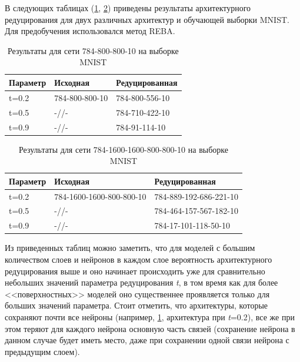 В следующих таблицах (\ref{table:architect_reduce_mnist_one}, \ref{table:architect_reduce_mnist_two}) приведены результаты архитектурного редуцирования для двух различных архитектур и обучающей выборки MNIST. Для предобучения использовался метод REBA.

\begin{table} [!h]
  \small
  \caption{Результаты для сети 784-800-800-10 на выборке MNIST}\label{table:architect_reduce_mnist_one}
    \centering
    \begin{tabular}{| p{2cm} | p{6cm} | p{6cm} |}
    \hline
        \textbf{Параметр} & \textbf{Исходная} & \textbf{Редуцированная}\\
    \hline
    t=0.2 & 784-800-800-10 & 784-800-556-10\\
    \hline
    t=0.5 & -//- & 784-710-422-10\\
    \hline
    t=0.9 & -//- & 784-91-114-10\\
    \hline
    \end{tabular}
    \end{table}
    
\begin{table} [!h]
  \small
    \caption{Результаты для сети 784-1600-1600-800-800-10 на выборке MNIST}\label{table:architect_reduce_mnist_two}
    \centering
    \begin{tabular}{| p{2cm} | p{6cm} | p{6cm} |}
    \hline
        \textbf{Параметр} & \textbf{Исходная} & \textbf{Редуцированная}\\
    \hline
    t=0.2 & 784-1600-1600-800-800-10 & 784-889-192-686-221-10\\
    \hline
    t=0.5 & -//- & 784-464-157-567-182-10\\
    \hline
    t=0.9 & -//- & 784-17-101-118-50-10\\
    \hline
    \end{tabular}
    \end{table}
    
Из приведенных таблиц можно заметить, что для моделей с большим количеством слоев и нейронов в каждом слое вероятность архитектурного редуцирования выше и оно начинает происходить уже для сравнительно небольших значений параметра редуцирования \textit{t}, в том время как для более <<поверхностных>> моделей оно существеннее проявляется только для больших значений параметра. Стоит отметить, что архитектуры, которые сохраняют почти все нейроны (например, \ref{table:architect_reduce_mnist_one}, архитектура при \textit{t}=0.2), все же при этом теряют для каждого нейрона основную часть связей (сохранение нейрона в данном случае будет иметь место, даже при сохранении одной связи нейрона с предыдущим слоем).

